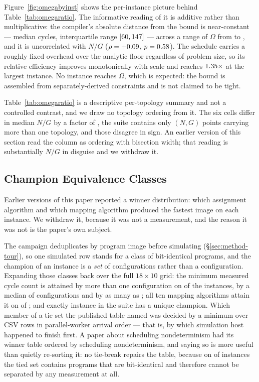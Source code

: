 \documentclass[journal,10pt]{IEEEtran}
\theoremstyle{plain}
\theoremstyle{definition}
\theoremstyle{remark}
\begin{document}
Figure~\ref{fig:omegabyinst} shows the per-instance picture behind
Table~\ref{tab:omegaratio}. The informative reading of it is additive rather
than multiplicative: the compiler's absolute distance from the bound is
near-constant --- median \SlackMedian{} cycles, interquartile range
$[60, 147]$ --- across a range of $\Omega$ from
\SlackOmegaLo{} to \SlackOmegaHi{}, and it is uncorrelated with $N/G$
($\rho = +0.09{}$, $p = 0.58{}$). The schedule carries a roughly
fixed overhead over the analytic floor regardless of problem size, so its
relative efficiency improves monotonically with scale and reaches
$1.35\times$ at the largest instance. No instance reaches $\Omega$,
which is expected: the bound is assembled from separately-derived
constraints and is not claimed to be tight.

Table~\ref{tab:omegaratio} is a descriptive per-topology summary and not a
controlled contrast, and we draw no topology ordering from it. The six cells
differ in median $N/G$ by a factor of \TopoNGSpread{}, the suite contains
only \TopoMultiPoint{} $(N,G)$ points carrying more than one topology, and
those \TopoMultiPoint{} disagree in sign. An earlier version of this section
read the column as ordering with bisection width; that reading is
substantially $N/G$ in disguise and we withdraw it.

\subsection{Champion Equivalence Classes}\label{sec:results-classes}

Earlier versions of this paper reported a winner distribution: which
assignment algorithm and which mapping algorithm produced the fastest image
on each instance. We withdraw it, because it was not a measurement, and the
reason it was not is the paper's own subject.

The campaign deduplicates by program image before simulating
(\S\ref{sec:method-tour}), so one simulated row stands for a class of
bit-identical programs, and the champion of an instance is a \emph{set} of
configurations rather than a configuration. Expanding those classes back over
the full $18\times10$ grid: the minimum measured cycle count is attained by
more than one configuration on \ClsTied{} of the \TournNInst{} instances, by
a median of \ClsMedian{} configurations and by as many as \ClsMax{}; all ten
mapping algorithms attain it on \ClsAllMappings{} of \TournNInst{}; and
exactly \ClsUnique{} instance in the suite has a unique champion. Which
member of a tie set the published table named was decided by a minimum over
CSV rows in parallel-worker arrival order --- that is, by which simulation
host happened to finish first. A paper about scheduling nondeterminism had its
winner table ordered by scheduling nondeterminism, and saying so is more
useful than quietly re-sorting it: no tie-break repairs the table, because on
\ClsTied{} of \TournNInst{} instances the tied set contains programs that are
bit-identical and therefore cannot be separated by any measurement at all.
\end{document}
